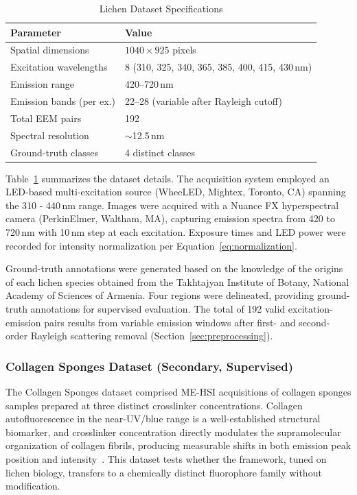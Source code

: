 \begin{table}[!t]
\centering
\caption{Lichen Dataset Specifications}
\label{tab:dataset}
\begin{tabular}{@{}ll@{}}
\toprule
\textbf{Parameter} & \textbf{Value} \\
\midrule
Spatial dimensions & $1040 \times 925$ pixels \\
Excitation wavelengths & 8 (310, 325, 340, 365, 385, 400, 415, 430\,nm) \\
Emission range & 420--720\,nm \\
Emission bands (per ex.) & 22--28 (variable after Rayleigh cutoff) \\
Total EEM pairs & 192 \\
Spectral resolution & $\sim$12.5\,nm \\
Ground-truth classes & 4 distinct classes \\
\bottomrule
\end{tabular}
\end{table}

Table~\ref{tab:dataset} summarizes the dataset details.
The acquisition system employed an LED-based multi-excitation source (WheeLED, Mightex, Toronto, CA) spanning the 310 - 440\,nm range. Images were acquired with a Nuance FX hyperspectral camera (PerkinElmer, Waltham, MA), capturing emission spectra from 420 to 720\,nm with 10\,nm step at each excitation.
Exposure times and LED power were recorded for intensity normalization per Equation~\eqref{eq:normalization}.

Ground-truth annotations were generated based on the knowledge of the origins of each lichen species obtained from the Takhtajyan Institute of Botany, National Academy of Sciences of Armenia.
Four regions were delineated, providing ground-truth annotations for supervised evaluation.
The total of 192 valid excitation-emission pairs results from variable emission windows after first- and second-order Rayleigh scattering removal (Section~\ref{sec:preprocessing}).

\subsubsection{Collagen Sponges Dataset (Secondary, Supervised)}
\label{sec:dataset_pepsin}

The Collagen Sponges dataset comprised ME-HSI acquisitions of collagen sponges samples prepared at three distinct crosslinker concentrations.
Collagen autofluorescence in the near-UV/blue range is a well-established structural biomarker, and crosslinker concentration directly modulates the supramolecular organization of collagen fibrils, producing measurable shifts in both emission peak position and intensity~\cite{lakowicz2006principles,meysurova2021optical}.
This dataset tests whether the framework, tuned on lichen biology, transfers to a chemically distinct fluorophore family without modification.

